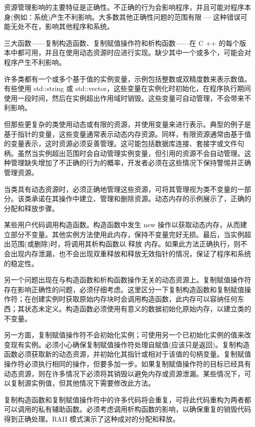 资源管理影响的主要特征是正确性。不正确的行为会影响程序，并且可能对程序本身(例如：系统)产生不利影响。大多数其他正确性问题的范围有限 — 这种错误可能无处不在，影响其他程序和系统。

三大函数——复制构造函数、复制赋值操作符和析构函数——在 C ++ 的每个版本中都可用，并且在使用动态资源时应进行实现。缺少其中一个或多个，可能会对程序产生不利影响。

许多类都有一个或多个基于值的实例变量，示例包括整数或双精度数来表示数值。有些使用 std::string 或 std::vector，这些变量在实例化时初始化，在程序执行期间使用一段时间，然后在实例超出作用域时销毁。这些变量可自动管理，不会带来不利影响。

但那些更复杂的类使用动态或有限的资源，并使用变量来进行表示。典型的例子是基于指针的变量，这些变量通常表示动态内存资源。同样，有限资源通常由基于值的变量表示，这时资源必须妥善管理。这可能包括数据库连接、套接字或文件句柄。虽然当实例超出范围时会自动管理实例变量，但引用的资源不会自动管理。这种管理缺失增加了不正确的行为的概率，开发者必须在这些情况下保持警惕并正确管理资源。


当类具有动态资源时，必须正确地管理这些资源，可将其管理视为类不变量的一部分。该类承诺在其操作中建立、管理和删除资源。动态内存的示例展示了，正确的分配和释放步骤。

某些用户代码调用构造函数。构造函数中发生 new 操作以获取动态内存，从而建立部分不变量。其他实例方法使用此内存，保持不变量完好无损。最后，当实例超出范围(或删除)时，将调用其析构函数以 释放 内存。如果此方法正确执行，则不会出现内存泄漏，也不会出现双重释放和释放无效指针的情况，保证了程序和系统的稳定性。

另一个问题出现在与构造函数和析构函数操作无关的动态资源上。复制赋值操作符存在影响正确性的问题，必须仔细考虑。这里区分一下复制构造函数和复制赋值操作符；在创建实例时获取原始内存块时会调用构造函数，此内存可以容纳任何东西；其状态未定义。构造函数必须使用有意义的数据初始化原始内存，以建立类的不变量。

另一方面，复制赋值操作符不会初始化实例；可使用另一个已初始化实例的值来改变现有实例。必须小心确保复制赋值操作符处理自赋值(应该只是返回)。复制构造函数必须获取新的动态资源，并初始化其指针或相对于该值的句柄变量。复制赋值操作符必须执行相同的操作，但要多加一步。如果复制赋值操作符的目标已经具有动态资源，则在许多情况下必须将其销毁以避免内存或资源泄漏。某些情况下，可以复制源实例值，但其他情况下需要修改此方法。

复制构造函数和复制赋值操作符中的许多代码将会重复，可将此代码重构为两者都可以调用的私有辅助函数。必须考虑调用析构函数的影响，以确保重复的销毁代码得到正确处理。RAII 模式演示了这种成对的分配和释放。

